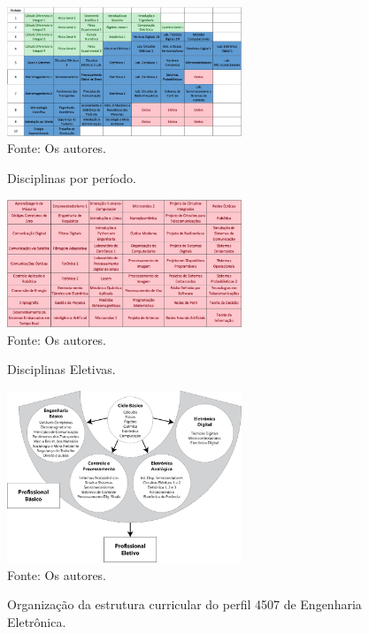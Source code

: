 \begin{figure}[h!]
	\caption{Disciplinas por período.}
	\begin{center}
		\includegraphics[width=7cm]{Ilustrações/Figura 01.jpg}\\
		{\footnotesize Fonte: Os autores.}
		\label{3.2b.eps}
	\end{center}
\end{figure}

\begin{figure}[h!]
	\caption{Disciplinas Eletivas.}
	\begin{center}
		\includegraphics[width=7cm]{Ilustrações/Figura 02.jpg}\\
		{\footnotesize Fonte: Os autores.}
		\label{3.2b.eps}
	\end{center}
\end{figure}

\begin{figure}[h!]
	\caption{Organização da estrutura curricular do perfil 4507 de Engenharia Eletrônica.}
	\begin{center}
		\includegraphics[width=7cm]{Ilustrações/Figura 03.jpg}\\
		{\footnotesize Fonte: Os autores.}
		\label{3.2b.eps}
	\end{center}
\end{figure}

